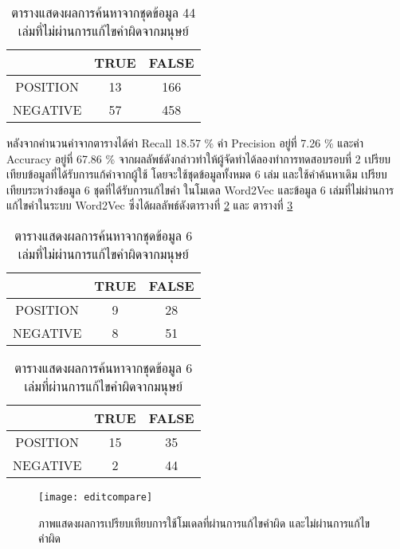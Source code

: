 \begin{table}[H]
    \caption{ตารางแสดงผลการค้นหาจากชุดข้อมูล 44 เล่มที่ไม่ผ่านการแก้ไขคำผิดจากมนุษย์}\label{tbl:evasearch1}
    \begin{tabular}{|c|c|c|}
    \hline
             & TRUE & FALSE \\ \hline
    POSITION & 13   & 166   \\ \hline
    NEGATIVE & 57   & 458   \\ \hline
    \end{tabular}
    \end{table}

    หลังจากคำนวนค่าจากตารางได้ค่า Recall 18.57 \% ค่า Precision อยู่ที่ 7.26 \% และค่า Accuracy อยู่ที่ 67.86 \%  
    จากผลลัพธ์ดังกล่าวทำให้ผู้จัดทำได้ลองทำการทดสอบรอบที่ 2 เปรียบเทียบข้อมูลที่ได้รับการแก้คำจากผู้ใช้ 
    โดยจะใช้ชุดข้อมูลทั้งหมด 6 เล่ม และใช้คำค้นหาเดิม เปรียบเทียบระหว่างข้อมูล 6 ชุดที่ได้รับการแก้ไขคำ
    ในโมเดล Word2Vec และข้อมูล 6 เล่มที่ไม่ผ่านการแก้ไขคำในระบบ Word2Vec ซึ่งได้ผลลัพธ์ดังตารางที่ 
    \ref{tbl:evasearch2} และ ตารางที่ \ref{tbl:evasearch3}

\begin{table}[H]
    \caption{ตารางแสดงผลการค้นหาจากชุดข้อมูล 6 เล่มที่ไม่ผ่านการแก้ไขคำผิดจากมนุษย์}\label{tbl:evasearch2}
    \begin{tabular}{|c|c|c|}
    \hline
                & TRUE & FALSE \\ \hline
    POSITION & 9   & 28   \\ \hline
    NEGATIVE & 8   & 51   \\ \hline
    \end{tabular}
    \end{table}

\begin{table}[H]
    \caption{ตารางแสดงผลการค้นหาจากชุดข้อมูล 6 เล่มที่ผ่านการแก้ไขคำผิดจากมนุษย์}\label{tbl:evasearch3}
    \begin{tabular}{|c|c|c|}
    \hline
                & TRUE & FALSE \\ \hline
    POSITION & 15   & 35   \\ \hline
    NEGATIVE & 2   & 44   \\ \hline
    \end{tabular}
    \end{table}

\begin{figure}[H]
    \centering
    \texttt{[image: editcompare]}
    \caption{ภาพแสดงผลการเปรียบเทียบการใช้โมเดลที่ผ่านการแก้ไขคำผิด และไม่ผ่านการแก้ไขคำผิด}\label{fig:editcompare}
\end{figure}
    
